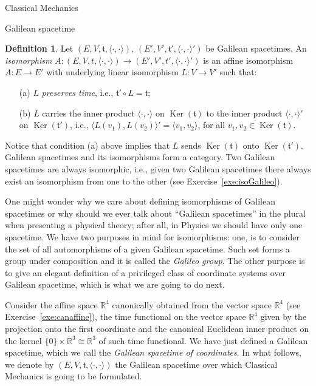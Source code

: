 \documentclass[oneside,a4paper,11pt]{amsbook}
\newcommand{\R}{\mathds R}
\DeclareMathOperator{\Ker}{Ker}
\theoremstyle{remark}\newtheorem{exercise}{Exercise}[chapter]
\theoremstyle{plain}\newtheorem{teo}{Theorem}[section]
\theoremstyle{plain}\newtheorem{lem}[teo]{Lemma}
\theoremstyle{plain}\newtheorem{prop}[teo]{Proposition}
\theoremstyle{plain}\newtheorem{cor}[teo]{Corollary}
\theoremstyle{definition}\newtheorem{defin}[teo]{Definition}
\theoremstyle{remark}\newtheorem{rem}[teo]{Remark}
\theoremstyle{definition}\newtheorem{notation}[teo]{Notation}
\theoremstyle{definition}\newtheorem{convention}[teo]{Convention}
\theoremstyle{definition}\newtheorem{example}[teo]{Example}
\numberwithin{section}{chapter}
\numberwithin{equation}{section}
\begin{document}
\begin{chapter}{Classical Mechanics}
\begin{section}{Galilean spacetime}
\begin{defin}\label{thm:isoGalileo}
Let $(E,V,\mathfrak t,\langle\cdot,\cdot\rangle)$, $(E',V',\mathfrak t',\langle\cdot,\cdot\rangle')$ be Galilean spacetimes.
An {\em isomorphism\/} $A:(E,V,t,\langle\cdot,\cdot\rangle)\to(E',V',t',\langle\cdot,\cdot\rangle')$ is an affine
isomorphism $A:E\to E'$ with underlying linear isomorphism $L:V\to V'$ such that:
\begin{itemize}
\item[(a)] $L$ {\em preserves time}, i.e., $\mathfrak t'\circ L=\mathfrak t$;
\item[(b)] $L$ carries the inner product $\langle\cdot,\cdot\rangle$ on $\Ker(\mathfrak t)$ to the inner product
$\langle\cdot,\cdot\rangle'$ on $\Ker(\mathfrak t')$, i.e., $\langle L(v_1),L(v_2)\rangle'=\langle v_1,v_2\rangle$,
for all $v_1,v_2\in\Ker(\mathfrak t)$.
\end{itemize}
\end{defin}
Notice that condition (a) above implies that $L$ sends $\Ker(\mathfrak t)$ onto $\Ker(\mathfrak t')$.
Galilean spacetimes and its isomorphisms form a category. Two Galilean spacetimes are always isomorphic, i.e.,
given two Galilean spacetimes there always exist an isomorphism from one to the other (see
Exercise~\ref{exe:isoGalileo}).

One might wonder why we care about defining isomorphisms of Galilean spacetimes or why should we ever talk about
``Galilean spacetimes'' in the plural when presenting a physical theory;
after all, in Physics we should have only one spacetime. We have two purposes in mind
for isomorphisms: one, is to consider the set of all automorphisms of a given Galilean spacetime. Such set
forms a group under composition and it is called the {\em Galileo group}. The other purpose is to give an elegant
definition of a privileged class of coordinate systems over Galilean spacetime, which is what we are going to do next.

Consider the affine space $\R^4$ canonically obtained from the vector space $\R^4$ (see Exercise~\ref{exe:canaffine}),
the time functional on the vector space $\R^4$ given by the projection onto the first coordinate and the canonical
Euclidean inner product on the kernel $\{0\}\times\R^3\cong\R^3$ of such time functional.
We have just defined a Galilean spacetime, which we call the
{\em Galilean spacetime of coordinates}. In what follows, we denote by
$(E,V,\mathfrak t,\langle\cdot,\cdot\rangle)$ the Galilean spacetime over which Classical Mechanics is going to be
formulated.


\end{section}
\end{chapter}
\end{document}
